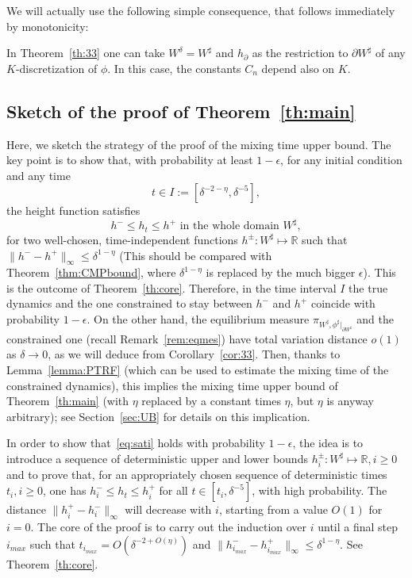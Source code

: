 \documentclass[10pt]{amsart}
\theoremstyle{definition}\newtheorem{defi}[theo]{Definition}\newtheorem{rema}[theo]{Remark}\newtheorem{exam}[theo]{Example}\newtheorem{exem}[theo]{Example}\newtheorem{nota}[theo]{Notation}
\newcommand{\R}{\mathbb{R}}
\renewcommand{\d}{{\sharp }}
\begin{document}
We will actually use the following simple consequence, that follows immediately by monotonicity:
\begin{coro}\label{cor:33}
In Theorem~\ref{th:33} one can take $W^\delta= W^\d$ and $h_\partial$ as the restriction to $\partial W^\d$ of any $K$-discretization of $\phi$. In this case, the constants $C_n$ depend also on $K$.
\end{coro}


\subsection{Sketch of the proof of Theorem~\ref{th:main}}\label{sec:overview}

Here, we sketch the strategy of the proof of the mixing time upper bound. The key point is to show that, with probability at least $1-\epsilon$, for any initial condition and any time
\begin{equation}
t\in I:= \left[\delta^{-2-\eta},\delta^{-5}\right],
\end{equation}
the height function satisfies
\begin{equation}\label{eq:sati}
h^-\le h_t\le h^+ \text{ in the whole domain } W^\d,
\end{equation}
for two well-chosen, time-independent functions $h^\pm:W^\d\mapsto \R$ such that $\|h^--h^+\|_\infty \le \delta^{1-\eta}$ (This should be compared with Theorem~\ref{thm:CMPbound}, where $\delta^{1-\eta}$ is replaced by the much bigger $\epsilon$). This is the outcome of
Theorem~\ref{th:core}. Therefore, in the time interval $I$ the true dynamics and the one constrained to stay between $h^-$ and $h^+$ coincide with probability $1-\epsilon$. On the other hand, the equilibrium measure $\pi_{W^\d,\phi^\d|_{\partial W^\d}}$ and the constrained one (recall Remark~\ref{rem:eqmes}) have total variation distance $o(1)$ as $\delta\to0$, as we will deduce from Corollary~\ref{cor:33}. Then, thanks to Lemma~\ref{lemma:PTRF} (which can be used to estimate the mixing time of the constrained dynamics), this implies the mixing time upper bound of Theorem~\ref{th:main} (with $\eta$ replaced by a constant times $\eta$, but $\eta$ is anyway arbitrary); see Section~\ref{sec:UB} for details on this implication.

In order to show that~\eqref{eq:sati} holds with probability $1-\epsilon$, the idea is to introduce a sequence of deterministic upper and lower bounds $h^\pm_i:W^\d\mapsto \R,i\ge0$ and to prove that, for an appropriately chosen sequence of deterministic times $t_i,i\ge0$, one has $h^{-}_{i} \leq h_t \leq h^{+}_{i}$ for all $t \in [t_i, \delta^{-5}]$, with high probability. The distance $\|h_i^+-h^-_i\|_\infty$ will decrease with $i$, starting from a value $O(1)$ for $i=0$. The core of the proof is to carry out the induction over $i$ until a final step $i_{max}$ such that $t_{i_{max}}=O(\delta^{-2+O(\eta)})$ and $\|h^-_{i_{max}}-h^+_{i_{max}}\|_\infty\le \delta^{1-\eta}.$ See Theorem~\ref{th:core}.
\end{document}
